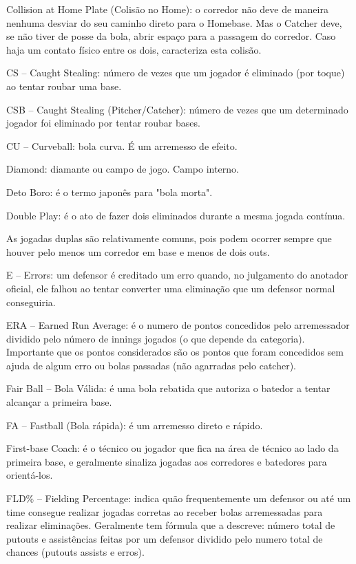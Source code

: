  Collision at Home Plate (Colisão no Home): o corredor não deve de maneira nenhuma desviar do seu caminho direto para o Homebase. Mas o Catcher deve,
 se não tiver de posse da bola, abrir espaço para a passagem do corredor. Caso haja um contato físico entre os dois, caracteriza esta colisão.

 CS -- Caught Stealing: número de vezes que um jogador é eliminado (por toque) ao tentar roubar uma base.

 CSB -- Caught Stealing (Pitcher/Catcher): número de vezes que um determinado jogador foi eliminado por tentar roubar bases.

 CU -- Curveball: bola curva. É um arremesso de efeito.

 Diamond: diamante ou campo de jogo. Campo interno.

 Deto Boro: é o termo japonês para "bola morta".

 Double Play: é o ato de fazer dois eliminados durante a mesma jogada contínua.

 As jogadas duplas são relativamente comuns, pois podem ocorrer sempre que houver pelo menos um corredor em base e menos de dois outs.


 E -- Errors: um defensor é creditado um erro quando, no julgamento do anotador oficial, ele falhou ao tentar converter uma eliminação que um defensor normal conseguiria.

 ERA -- Earned Run Average: é o numero de pontos concedidos pelo arremessador dividido pelo número de innings jogados (o que depende da categoria). Importante que os pontos considerados são os pontos que foram concedidos sem ajuda de algum erro ou bolas passadas (não agarradas pelo catcher).

 Fair Ball -- Bola Válida: é uma bola rebatida que autoriza o batedor a tentar alcançar a primeira base.

 FA -- Fastball (Bola rápida): é um arremesso direto e rápido.

 First-base Coach: é o técnico ou jogador que fica na área de técnico ao lado da primeira base, e geralmente sinaliza jogadas aos corredores e batedores para orientá-los.

 FLD\% -- Fielding Percentage: indica quão frequentemente um defensor ou até um time consegue realizar jogadas corretas ao receber bolas arremessadas para realizar eliminações. Geralmente tem fórmula que a descreve: número total de putouts e assistências feitas por um defensor dividido pelo numero total de chances (putouts assists e erros).




